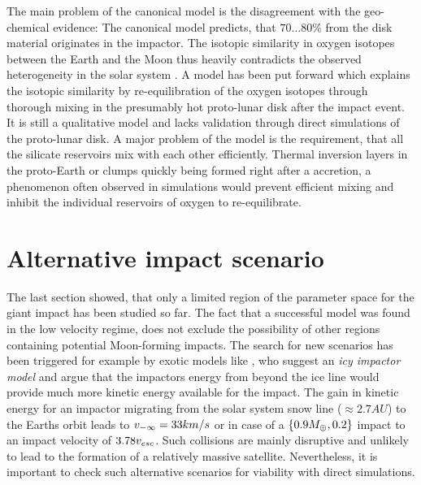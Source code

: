 The main problem of the canonical model is the disagreement with the geo-chemical evidence: The canonical model predicts, that $70 \dots 80 \%$ from the disk material originates in the impactor. The isotopic similarity in oxygen isotopes between the Earth and the Moon thus heavily contradicts the observed heterogeneity in the solar system \citep{Wiechert:2001p3543}. A model has been put forward \citep{Pahlevan:2007p2065, 2011E&PSL.301..433P} which explains the isotopic similarity by re-equilibration of the oxygen isotopes through thorough mixing in the presumably hot proto-lunar disk after the impact event. It is still a qualitative model and lacks validation through direct simulations of the proto-lunar disk. A major problem of the model is the requirement, that all the silicate reservoirs mix with each other efficiently. Thermal inversion layers in the proto-Earth or clumps quickly being formed right after a accretion, a phenomenon often observed in simulations \citep{1997Icar..126..126C, Cameron:2000p1854, Canup:2001p1861, Canup:2004p115} would prevent efficient mixing and inhibit the individual reservoirs of oxygen to re-equilibrate.

\section{Alternative impact scenario}
The last section showed, that only a limited region of the parameter space for the giant impact has been studied so far. The fact that a successful model was found in the low velocity regime, does not exclude the possibility of other regions containing potential Moon-forming impacts. The search for new scenarios has been triggered for example by exotic models like \cite{2010M&PSA..73.5140W}, who suggest an \emph{icy impactor model} and argue that the impactors energy from beyond the ice line would provide much more kinetic energy available for the impact. The gain in kinetic energy for an impactor migrating from the solar system snow line ($\approx 2.7 AU$) to the Earths orbit leads to $v_{-\infty} = 33 km/s$ or in case of a $\{0.9 M_{\oplus}, 0.2\}$ impact to an impact velocity of $3.78 v_{esc}$. Such collisions are mainly disruptive and unlikely to lead to the formation of a relatively massive satellite. Nevertheless, it is important to check such alternative scenarios for viability with direct simulations.


